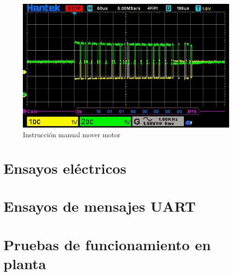 \begin{figure}[htbp]
	\centering
	\includegraphics[scale=0.6]{./Figures/Motor_Manual_Move_CCW_360DEG.jpg}
	\caption{Instrucción manual mover motor}
	\label{fig:mot_move}
\end{figure}

\section{Ensayos eléctricos}

\section{Ensayos de mensajes UART}

\section{Pruebas de funcionamiento en planta}

